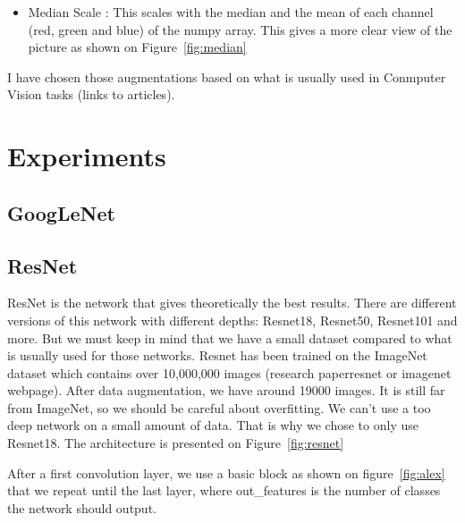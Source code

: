 \begin{itemize}
    \item Median Scale : This scales with the median and the mean of each channel (red, green and blue) of the numpy array. This gives a more clear view of the picture as shown on Figure~\ref{fig:median}  
 \end{itemize}

I have chosen those augmentations based on what is usually used in Conmputer Vision tasks (links to articles).


\section{Experiments}
\subsection{GoogLeNet}
\subsection{ResNet}
ResNet is the network that gives theoretically the best results. There are different versions of this network with different depths: Resnet18, Resnet50, Resnet101 and more. But we must keep in mind that we have a small dataset compared to what is usually used for those networks. Resnet has been trained on the ImageNet dataset which contains over 10,000,000 images (research paperresnet or imagenet webpage). After data augmentation, we have around 19000 images. It is still far from ImageNet, so we should be careful about overfitting. We can't use a too deep network on a small amount of data. That is why we chose to only use Resnet18. The architecture is presented on Figure~\ref{fig:resnet}

After a first convolution layer, we use a basic block as shown on figure~\ref{fig:alex} that we repeat until the last layer, where out\_features is the number of classes the network should output. 
